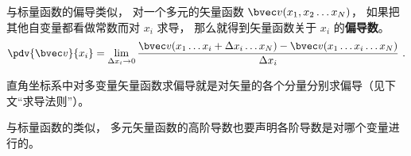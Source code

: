 
\begin{issues}
\issueDraft
\end{issues}

与标量函数的偏导类似， 对一个多元的矢量函数 $\bvec v(x_1, x_2\ldots x_N)$， 如果把其他自变量都看做常数而对 $x_i$ 求导， 那么就得到矢量函数关于 $x_i$ 的\textbf{偏导数}。
\begin{equation}
\pdv{\bvec v}{x_i} = \lim_{\Delta x_i \to 0} \frac{\bvec v(x_1 \ldots x_i+\Delta x_i\ldots x_N) -  \bvec v(x_1 \ldots x_i\ldots x_N)}{\Delta x_i}~.
\end{equation}

直角坐标系中对多变量矢量函数求偏导就是对矢量的各个分量分别求偏导（见下文“求导法则”）。


与标量函数的类似， 多元矢量函数的高阶导数也要声明各阶导数是对哪个变量进行的。
